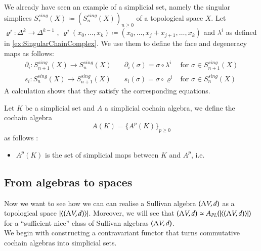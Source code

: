  \begin{Example}
 \label{ex:SingularSimplicesAreSimplicialSets}
    We already have seen an example of a simplicial set, namely the singular simplices 
    $S^{sing}_*(X) \coloneqq (S_n^{sing}(X))_{n \geq 0}$ of a topological space $X$.
    Let
    $\varrho^j \colon \Delta^k \to \Delta^{k - 1}$ ,
    ${\varrho^j(x_0, \dotsc , x_k) \coloneqq (x_0 , \dotsc, x_j + x_{j + 1} , \dotsc, x_k)}$ and 
    $\lambda^i$ as defined in \ref{ex:SingularChainComplex}. We use them to define the face
    and degeneracy maps as follows:
    \begin{align*}
     \partial_i \colon S_{n+1}^{sing}(X) \to S_n^{sing}(X) \quad	 &	 \partial_i(\sigma) =
      \sigma \circ \lambda^i  & \text{for $\sigma \in S_{n+1}^{sing}(X)$} 	\\
     s_i \colon S_n^{sing}(X) \to S_{n+1}^{sing}(X) \quad	&	s_i( \sigma) =
     \sigma \circ \varrho^i  & \text{for $\sigma \in S_{n}^{sing}(X)$}
    \end{align*}
    A calculation shows that they satisfy the corresponding equations.
 \end{Example}

 \begin{Definition}
  Let $K$ be a simplicial set and $A$ a simplicial cochain algebra, we define the cochain algebra
  $$ A(K) = { \lbrace A^p(K) \rbrace}_{ p \geq 0} $$
  as follows :
  \begin{itemize}
   \item $A^p(K)$ is the set of simplicial maps between $K$ and $A^p$, i.e. 
  \end{itemize}
 \end{Definition}

 \subsection{From algebras to spaces}
 
 Now we want to see how we can can realise a Sullivan algebra $(\Lambda V,d)$ as a topological space 
 $| \langle (\Lambda V,d) \rangle |$. Moreover, we will see that $(\Lambda V,d) \simeq A_{PL}(| \langle (\Lambda V,d) \rangle |)$ for a
 ``sufficient nice'' class of Sullivan algebras $(\Lambda V,d)$. \\
 We begin with constructing a contravariant functor that turns commutative cochain algebras into simplicial sets.
 
